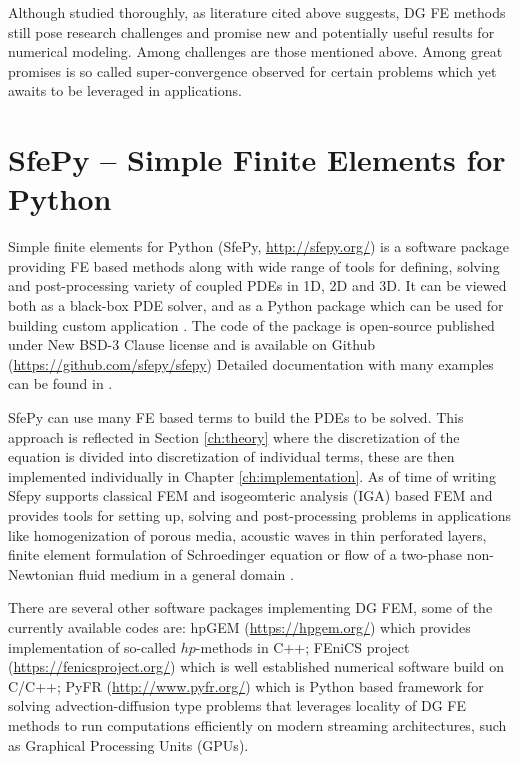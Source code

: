 Although studied thoroughly, as literature cited above suggests, DG FE 
methods still pose research challenges and promise new and potentially useful results for 
numerical modeling. Among challenges are those mentioned above. Among great promises is 
so called super-convergence observed for certain problems \cite{Roe2017} which yet awaits 
to be leveraged in applications.


\section{SfePy -- Simple Finite Elements for Python}

Simple finite elements for Python (SfePy, 
\url{http://sfepy.org/}) is a software 
package providing FE based methods along with wide range of tools for defining, solving 
and post-processing variety of coupled PDEs in 1D, 2D and 3D. It can be viewed both as a 
black-box PDE solver, and as a Python package which can be used for building custom 
application \cite{Cimrman_Lukes_Rohan_2019}. The code of the package is open-source 
published under New BSD-3 Clause license \cite{bsd3-lic} and is available on Github 
(\url{https://github.com/sfepy/sfepy}) %
Detailed documentation with many examples can be found in 
\cite{sfepy-doc}.

SfePy can use many FE based terms to 
build the PDEs to be solved. This approach is reflected in Section \ref{ch:theory}
where the discretization of the equation is divided into discretization of individual 
terms, these are then implemented individually in Chapter \ref{ch:implementation}. As of 
time of writing Sfepy supports classical FEM and isogeomteric analysis (IGA) based FEM 
and 
provides tools for setting up, solving and post-processing problems in applications like 
homogenization of porous media, acoustic waves in thin perforated layers,  finite element 
formulation of Schroedinger equation or flow of a two-phase non-Newtonian fluid medium in 
a general domain \cite{Cimrman_Lukes_Rohan_2019}.

There are several other software packages implementing  DG FEM, some of the currently 
available codes are:
hpGEM \cite{hpgem2007} (\url{https://hpgem.org/}) which provides implementation of 
so-called $hp$-methods in C++; 
FEniCS project \cite{fenics2015} (\url{https://fenicsproject.org/}) which is well 
established numerical software build on C/C++;
PyFR \cite{pyfr2014} (\url{http://www.pyfr.org/}) which is  Python based framework for 
solving advection-diffusion type problems that leverages locality of DG FE methods to run 
computations efficiently on modern streaming architectures, such as Graphical 
Processing Units (GPUs)\cite[p. ]{pyfr2014}.






